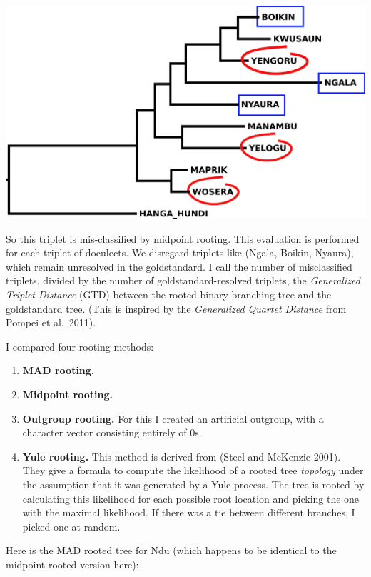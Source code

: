 \documentclass[
  a4paper,
  14pt,
  oneside,
  tablecaptionabove
]{scrbook}
\begin{document}
{\includegraphics[width=5.27083in,height=3.10417in]{images/Ndu.midpointRooted.triplets.jpg}}

{So this triplet is mis-classified by midpoint rooting. This evaluation
is performed for each triplet of doculects. We disregard triplets like
(Ngala, Boikin, Nyaura), which remain unresolved in the goldstandard. I
call the number of misclassified triplets, divided by the number of
goldstandard-resolved triplets, the \emph{Generalized Triplet Distance}
(GTD) between the rooted binary-branching tree and the goldstandard
tree. (This is inspired by the \emph{Generalized Quartet Distance} from
Pompei et al.~2011).}

{I compared four rooting methods:}

\begin{enumerate}
\def\labelenumi{\arabic{enumi}.}
\tightlist
\item
  {\textbf{MAD rooting.}}
\item
  {\textbf{Midpoint rooting.}}
\item
  {\textbf{Outgroup rooting.} For this I created an artificial outgroup,
  with a character vector consisting entirely of 0s.}
\item
  {\textbf{Yule rooting.} This method is derived from (Steel and
  McKenzie 2001). They give a formula to compute the likelihood of a
  rooted tree \emph{topology} under the assumption that it was generated
  by a Yule process. The tree is rooted by calculating this likelihood
  for each possible root location and picking the one with the maximal
  likelihood. If there was a tie between different branches, I picked
  one at random.}
\end{enumerate}

{Here is the MAD rooted tree for Ndu (which happens to be identical to
the midpoint rooted version here):}
\end{document}
